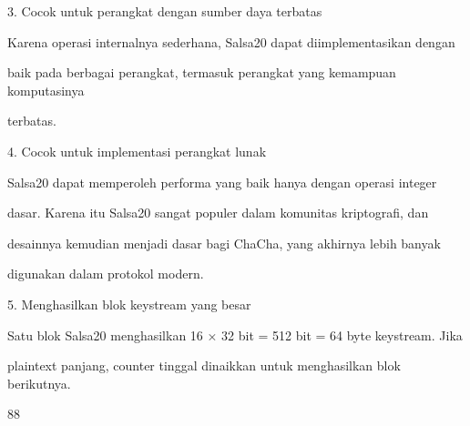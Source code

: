 \documentclass{article}
\begin{document}

3. Cocok untuk perangkat dengan sumber daya terbatas

Karena operasi internalnya sederhana, Salsa20 dapat diimplementasikan dengan 

baik pada berbagai perangkat, termasuk perangkat yang kemampuan komputasinya 

terbatas.

4. Cocok untuk implementasi perangkat lunak

Salsa20 dapat memperoleh performa yang baik hanya dengan operasi integer 

dasar. Karena itu Salsa20 sangat populer dalam komunitas kriptografi, dan 

desainnya kemudian menjadi dasar bagi ChaCha, yang akhirnya lebih banyak 

digunakan dalam protokol modern.

5. Menghasilkan blok keystream yang besar

Satu blok Salsa20 menghasilkan 16 × 32 bit = 512 bit = 64 byte keystream. Jika 

plaintext panjang, counter tinggal dinaikkan untuk menghasilkan blok berikutnya.

88
\end{document}
